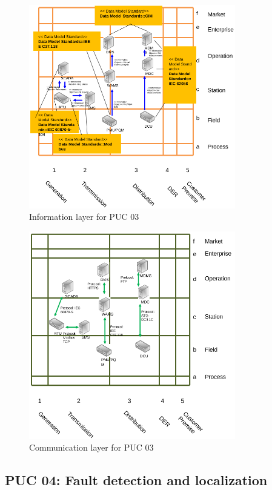 \begin{figure}[!htb]\centering
  \includegraphics[width=9.0cm]{Data/i3.png}
\caption{Information layer for PUC 03}
\label{fig:i3}
\end{figure}


\begin{figure}[!htb]\centering
  \includegraphics[width=9.0cm]{Data/c3.png}
\caption{Communication layer for PUC 03}
\label{fig:c3}
\end{figure}




\clearpage
\newpage
\subsection{PUC 04: Fault detection and localization}


